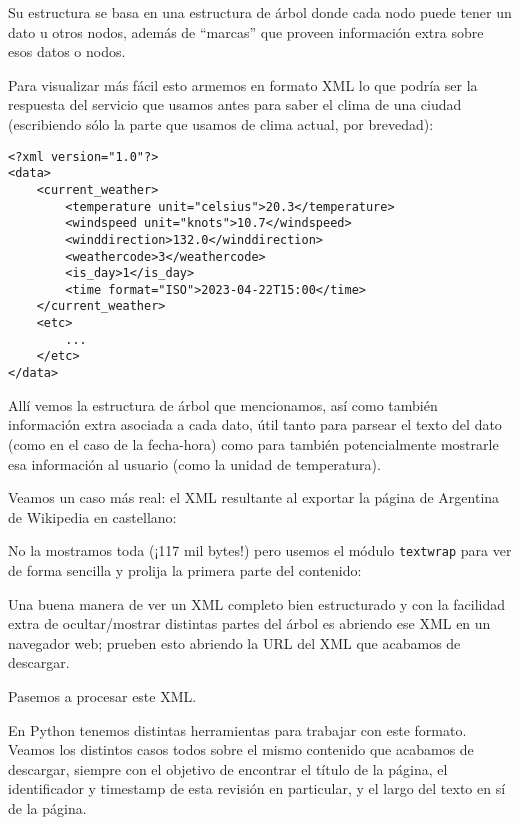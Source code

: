 Su estructura se basa en una estructura de árbol donde cada nodo puede tener un dato u otros nodos, además de ``marcas'' que proveen información extra sobre esos datos o nodos.

Para visualizar más fácil esto armemos en formato XML lo que podría ser la respuesta del servicio que usamos antes para saber el clima de una ciudad (escribiendo sólo la parte que usamos de clima actual, por brevedad):

\begin{verbatim}
<?xml version="1.0"?>
<data>
    <current_weather>
        <temperature unit="celsius">20.3</temperature>
        <windspeed unit="knots">10.7</windspeed>
        <winddirection>132.0</winddirection>
        <weathercode>3</weathercode>
        <is_day>1</is_day>
        <time format="ISO">2023-04-22T15:00</time>
    </current_weather>
    <etc>
        ...
    </etc>
</data>
\end{verbatim}

Allí vemos la estructura de árbol que mencionamos, así como también información extra asociada a cada dato, útil tanto para parsear el texto del dato (como en el caso de la fecha-hora) como para también potencialmente mostrarle esa información al usuario (como la unidad de temperatura).

Veamos un caso más real: el XML resultante al exportar la página de Argentina de Wikipedia en castellano:


No la mostramos toda (¡117 mil bytes!) pero usemos el módulo \texttt{textwrap} para ver de forma sencilla y prolija la primera parte del contenido:


\begin{info}
    Una buena manera de ver un XML completo bien estructurado y con la facilidad extra de ocultar/mostrar distintas partes del árbol es abriendo ese XML en un navegador web; prueben esto abriendo la URL del XML que acabamos de descargar.
\end{info}

Pasemos a procesar este XML.

En Python tenemos distintas herramientas para trabajar con este formato. Veamos los distintos casos todos sobre el mismo contenido que acabamos de descargar, siempre con el objetivo de encontrar el título de la página, el identificador y timestamp de esta revisión en particular, y el largo del texto en sí de la página.


